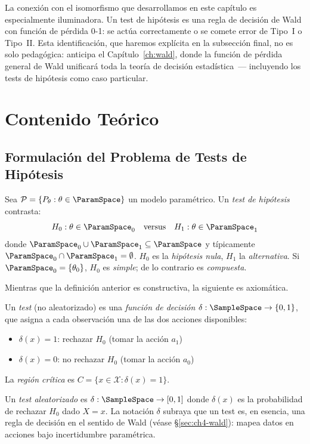 La conexión con el isomorfismo que desarrollamos en este capítulo es especialmente iluminadora. Un test de hipótesis es una regla de decisión de Wald con función de pérdida 0-1: se actúa correctamente o se comete error de Tipo~I o Tipo~II. Esta identificación, que haremos explícita en la subsección final, no es solo pedagógica: anticipa el Capítulo~\ref{ch:wald}, donde la función de pérdida general de Wald unificará toda la teoría de decisión estadística~--- incluyendo los tests de hipótesis como caso particular.

\section{Contenido Teórico}
\label{sec:ch4-teoria}

\subsection{Formulación del Problema de Tests de Hipótesis}
\label{sec:ch4-neyman-pearson}

\begin{definition}
	\label{def:ch4-hipotesis}
	Sea $\mathcal{P} = \{P_\theta : \theta \in \ParamSpace\}$ un modelo
	paramétrico. Un \emph{test de hipótesis} contrasta:
	\[
		H_0: \theta \in \ParamSpace_0 \quad \text{versus} \quad H_1: \theta \in \ParamSpace_1
	\]
	donde $\ParamSpace_0 \cup \ParamSpace_1 \subseteq \ParamSpace$ y típicamente
	$\ParamSpace_0 \cap \ParamSpace_1 = \emptyset$. $H_0$ es la \emph{hipótesis nula},
	$H_1$ la \emph{alternativa}. Si $\ParamSpace_0 = \{\theta_0\}$, $H_0$ es
	\emph{simple}; de lo contrario es \emph{compuesta}.
\end{definition}

Mientras que la definición anterior es constructiva, la siguiente es axiomática.

\begin{definition}
	\label{def:ch4-test}
	Un \emph{test} (no aleatorizado) es una \emph{función de decisión}
	$\delta: \SampleSpace \to \{0, 1\}$, que asigna a cada observación
	una de las dos acciones disponibles:
	\begin{itemize}
		\item $\delta(x) = 1$: rechazar $H_0$ (tomar la acción $a_1$)
		\item $\delta(x) = 0$: no rechazar $H_0$ (tomar la acción $a_0$)
	\end{itemize}
	La \emph{región crítica} es $C = \{x \in \mathcal{X}: \delta(x) = 1\}$.

	Un \emph{test aleatorizado} es $\delta: \SampleSpace \to [0, 1]$ donde
	$\delta(x)$ es la probabilidad de rechazar $H_0$ dado $X = x$.
	La notación $\delta$ subraya que un test es, en esencia, una regla de
	decisión en el sentido de Wald (véase \S\ref{sec:ch4-wald}): mapea datos
	en acciones bajo incertidumbre paramétrica.
\end{definition}

